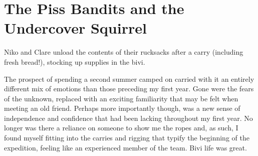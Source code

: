 \section{The Piss Bandits and the Undercover
Squirrel}

\begin{marginfigure}
\checkoddpage \ifoddpage \forcerectofloat \else \forceversofloat \fi
\centering
 \caption{Niko and Clare unload the contents of their rucksacks after a carry (including fresh bread!), stocking up supplies in the bivi. }
 \label{carry unload}
\end{marginfigure}

The prospect of spending a second summer camped on  carried with it an entirely different mix of emotions than those preceding my first year. Gone were the fears of the unknown, replaced with an exciting familiarity that may be felt when meeting an old friend. Perhaps more importantly though, was a new sense of independence and confidence that had been lacking throughout my first year. No longer was there a reliance on someone to show me the ropes and, as such, I found myself fitting into the carries and rigging that typify the beginning of the expedition, feeling like an experienced member of the team. Bivi life was great.

